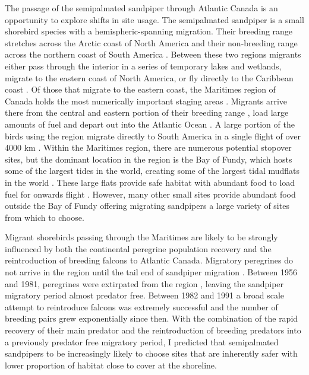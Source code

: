 The passage of the semipalmated sandpiper through Atlantic Canada is an opportunity to explore shifts in site usage. The semipalmated sandpiper is a small shorebird species with a hemispheric-spanning migration. Their breeding range stretches across the Arctic coast of North America and their non-breeding range across the northern coast of South America \citep{hicklin2010semipalmated}. Between these two regions migrants either pass through the interior in a series of temporary lakes and wetlands, migrate to the eastern coast of North America, or fly directly to the Caribbean coast \citep{Brown2017}. Of those that migrate to the eastern coast, the Maritimes region of Canada holds the most numerically important staging areas \citep{Hicklin87}. Migrants arrive there from the central and eastern portion of their breeding range \citep{Brown2017}, load large amounts of fuel and depart out into the Atlantic Ocean \citep{Lank1983}. A large portion of the birds using the region migrate directly to South America in a single flight of over 4000 km \citep{Lank1979,Brown2017}. Within the Maritimes region, there are numerous potential stopover sites, but the dominant location in the region is the Bay of Fundy, which hosts some of the largest tides in the world, creating some of the largest tidal mudflats in the world \citep{garrett1972tidal}. These large flats provide safe habitat with abundant food to load fuel for onwards flight \citep{Hicklin1984,Sprague2008a,Quinn2012a}. However, many other small sites provide abundant food outside the Bay of Fundy \citep{EnvironmentCanada2009} offering migrating sandpipers a large variety of sites from which to choose.

Migrant shorebirds passing through the Maritimes are likely to be strongly influenced by both the continental peregrine population recovery and the reintroduction of breeding falcons to Atlantic Canada. Migratory peregrines do not arrive in the region until the tail end of sandpiper migration \citep{Hope2011,Worcester2008}. Between 1956 and 1981, peregrines were extirpated from the region \citep{amirault20041995}, leaving the sandpiper migratory period almost predator free. Between 1982 and 1991 a broad scale attempt to reintroduce falcons was extremely successful and the number of breeding pairs grew exponentially since then. With the combination of the rapid recovery of their main predator and the reintroduction of breeding predators into a previously predator free migratory period, I predicted that semipalmated sandpipers to be increasingly likely to choose sites that are inherently safer with lower proportion of habitat close to cover at the shoreline.

